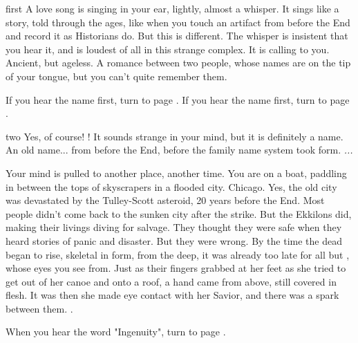 \documentclass[greennotebook]{Silversiders} %
\begin{document}
\startnotebook{\nLoveGreenTwo{}}

\begin{page}{first}
A love song is singing in your ear, lightly, almost a whisper. It sings like a story, told through the ages, like when you touch an artifact from before the End and record it as Historians do. But this is different. The whisper is insistent that you hear it, and is loudest of all in this strange complex. It is calling to you. Ancient, but ageless. A romance between two people, whose names are on the tip of your tongue, but you can't quite remember them.

If you hear the name \cIngenuityOld{} first, turn to page . If you hear the name \cSavior{} first, turn to page .
\end{page}

\begin{page}{two}
Yes, of course! \cIngenuityOld{\intro}! It sounds strange in your mind, but it is definitely a name. An old name... from before the End, before the family name system took form. \emph{\cIngenuityOld{}...}

Your mind is pulled to another place, another time. You are on a boat, paddling in between the tops of skyscrapers in a flooded city. Chicago. Yes, the old city was devastated by the Tulley-Scott asteroid, 20 years before the End. Most people didn't come back to the sunken city after the strike. But the Ekkilons did, making their livings diving for salvage. They thought they were safe when they heard stories of panic and disaster. But they were wrong. By the time the dead began to rise, skeletal in form, from the deep, it was already too late for all but \cIngenuityOld{}, whose eyes you see from. Just as their fingers grabbed at her feet as she tried to get out of her canoe and onto a roof, a hand came from above, still covered in flesh. It was then she made eye contact with her Savior, and there was a spark between them. \cSavior{}.

When you hear the word "Ingenuity", turn to page .
\end{page}
\end{document}
